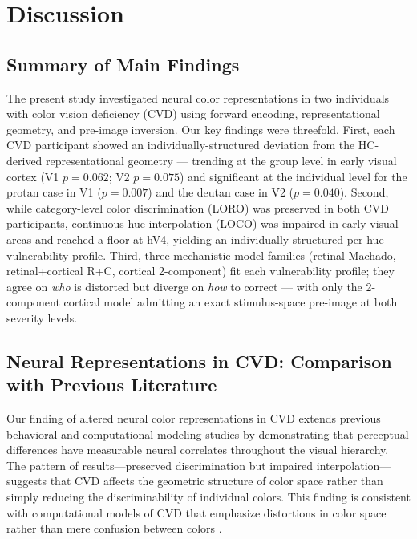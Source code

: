\section{Discussion}

\subsection{Summary of Main Findings}

The present study investigated neural color representations in two
individuals with color vision deficiency (CVD) using forward encoding,
representational geometry, and pre-image inversion. Our key findings
were threefold. First, each CVD participant showed an
individually-structured deviation from the HC-derived representational
geometry --- trending at the group level in early visual cortex
(V1 $p = 0.062$; V2 $p = 0.075$) and significant at the individual
level for the protan case in V1 ($p = 0.007$) and the deutan case in
V2 ($p = 0.040$). Second, while category-level color discrimination
(LORO) was preserved in both CVD participants, continuous-hue
interpolation (LOCO) was impaired in early visual areas and reached a
floor at hV4, yielding an individually-structured per-hue vulnerability
profile. Third, three mechanistic model families (retinal Machado,
retinal+cortical R+C, cortical 2-component) fit each vulnerability
profile; they agree on \emph{who} is distorted but diverge on
\emph{how} to correct --- with only the 2-component cortical model
admitting an exact stimulus-space pre-image at both severity levels.

\subsection{Neural Representations in CVD: Comparison with Previous Literature}

Our finding of altered neural color representations in CVD extends previous behavioral and computational modeling studies by demonstrating that perceptual differences have measurable neural correlates throughout the visual hierarchy. The pattern of results---preserved discrimination but impaired interpolation---suggests that CVD affects the geometric structure of color space rather than simply reducing the discriminability of individual colors. This finding is consistent with computational models of CVD that emphasize distortions in color space rather than mere confusion between colors \cite{brettel1997}.

